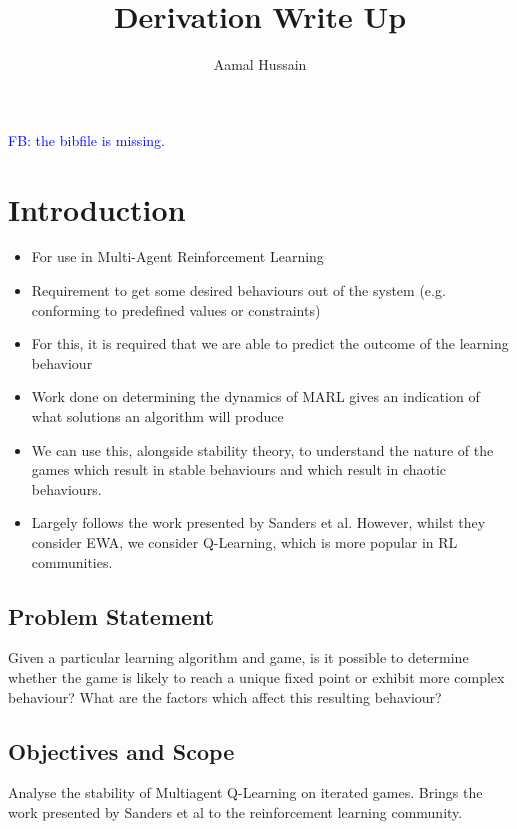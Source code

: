 \documentclass{article}
\title{Derivation Write Up}
\author{Aamal Hussain}
\newcommand\fb[1]{\textcolor{blue}{FB: #1}}
\begin{document}
\maketitle

\fb{the bibfile is missing.}
	
	\section{Introduction} %
	\label{sec:introduction}

	\begin{itemize}
			\item For use in Multi-Agent Reinforcement Learning
			\item Requirement to get some desired behaviours out of the system (e.g. conforming to
			predefined values or constraints)
			\item For this, it is required that we are able to predict the outcome of the learning
			behaviour
			\item Work done on determining the dynamics of MARL gives an indication of what
			solutions an algorithm will produce
			\item We can use this, alongside stability theory, to understand the nature of the games
			which result in stable behaviours and which result in chaotic behaviours.
			\item Largely follows the work presented by Sanders et al. However, whilst they consider
			EWA, we consider Q-Learning, which is more popular in RL communities.
	\end{itemize}	

	\subsection{Problem Statement} %
	\label{sub:problem_statement}
	
	Given a particular learning algorithm and game, is it possible to determine whether the game is
	likely to reach a unique fixed point or exhibit more complex behaviour? What are the factors
	which affect this resulting behaviour?

	
	\subsection{Objectives and Scope} %
	\label{sub:objectives_and_scope}

	Analyse the stability of Multiagent Q-Learning on iterated games. Brings the work presented by
	Sanders et al to the reinforcement learning community.
\end{document}

